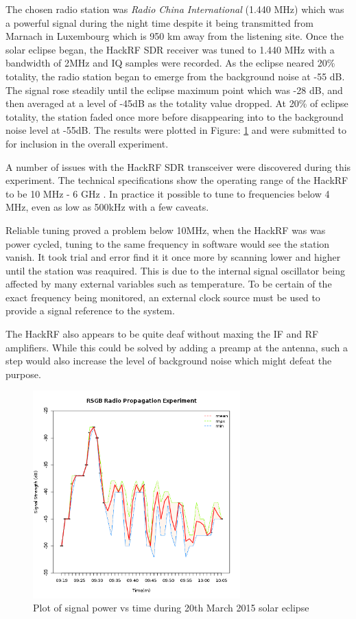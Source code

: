\documentclass[runningheads,a4paper]{llncs}
\begin{document}
The chosen radio station was \textit{Radio China International} (1.440 MHz) which was a powerful signal during the night time despite it being transmitted from Marnach in Luxembourg which is 950 km away from the listening site. Once the solar eclipse began, the HackRF \gls{SDR} receiver was tuned to 1.440 MHz with a bandwidth of 2MHz and \gls{IQ} samples were recorded. As the eclipse neared 20\% totality, the radio station began to emerge from the background noise at -55 dB. The signal rose steadily until the eclipse maximum point which was -28 dB, and then averaged at a level of -45dB as the totality value dropped. At 20\% of eclipse totality, the station faded once more before disappearing into to the background noise level at -55dB. The results were plotted in Figure: \ref{fig:signal_power_v_time_radio_propagation} and were submitted to \citet{RSGB-15-b} for inclusion in the overall experiment.

A number of issues with the HackRF \gls{SDR} transceiver were discovered during this experiment. The technical specifications show the operating range of the HackRF to be 10 MHz - 6 GHz \citep{ossmann-15-d}. In practice it possible to tune to frequencies below 4 MHz, even as low as 500kHz with a few caveats.

Reliable tuning proved a problem below 10MHz, when the HackRF was was power cycled, tuning to the same frequency in software would see the station vanish. It took trial and error find it it once more by scanning lower and higher until the station was reaquired. This is due to the internal signal oscillator being affected by many external variables such as temperature. To be certain of the exact frequency being monitored, an external clock source must be used to provide a signal reference to the system. 

The HackRF also appears to be quite deaf without maxing the IF and \gls{RF} amplifiers. While this could be solved by adding a \gls{preamp} at the antenna, such a step would also increase the level of background noise which might defeat the purpose.

%
\begin{figure}[here]
	\centering
	\includegraphics[width=8cm]{images/67}
	\caption{Plot of signal power vs time during 20th March 2015 solar eclipse}
	\label{fig:signal_power_v_time_radio_propagation}
\end{figure}
%
\end{document}
